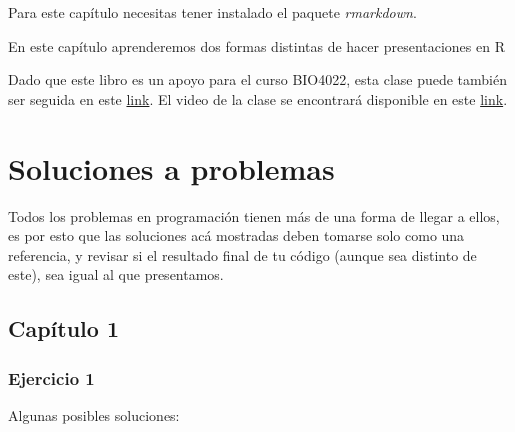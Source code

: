 \documentclass[]{book}
\newenvironment{Shaded}{\begin{snugshade}}{\end{snugshade}}
\newcommand{\KeywordTok}[1]{\textcolor[rgb]{0.13,0.29,0.53}{\textbf{#1}}}
\newcommand{\NormalTok}[1]{#1}
\newcommand{\OperatorTok}[1]{\textcolor[rgb]{0.81,0.36,0.00}{\textbf{#1}}}
\newcommand{\StringTok}[1]{\textcolor[rgb]{0.31,0.60,0.02}{#1}}
\begin{document}
Para este capítulo necesitas tener instalado el paquete
\emph{rmarkdown}.

En este capítulo aprenderemos dos formas distintas de hacer
presentaciones en R

Dado que este libro es un apoyo para el curso BIO4022, esta clase puede
también ser seguida en este
\href{https://derek-corcoran-barrios.github.io/Clase7/Clase7PresentacionesEnR}{link}.
El video de la clase se encontrará disponible en este
\href{https://youtu.be/fgX-FV7fuxA}{link}.

\hypertarget{soluciones}{%
\chapter{Soluciones a problemas}\label{soluciones}}

Todos los problemas en programación tienen más de una forma de llegar a
ellos, es por esto que las soluciones acá mostradas deben tomarse solo
como una referencia, y revisar si el resultado final de tu código
(aunque sea distinto de este), sea igual al que presentamos.

\hypertarget{capitulo-1}{%
\section{Capítulo 1}\label{capitulo-1}}

\hypertarget{ejercicio-1-3}{%
\subsection{Ejercicio 1}\label{ejercicio-1-3}}

Algunas posibles soluciones:

\begin{Shaded}
\end{Shaded}

\begin{Shaded}
\end{Shaded}
\end{document}
